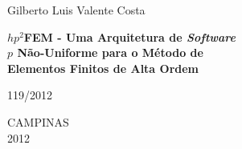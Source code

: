 \thispagestyle{fancy}
\fancyhf{}
\cfoot{\thepage}


\begin{center}
\vspace*{6.cm}

Gilberto Luis Valente Costa

\vspace{2.6cm}
{\fontsize{23}{23} \textbf{$hp^2$FEM - Uma Arquitetura de \textit{Software}}}	\\ \vspace{1.2ex}
{\fontsize{23}{23} \textbf{$p$ Não-Uniforme para o Método de}}			\\ \vspace{1.2ex}
{\fontsize{23}{23} \textbf{Elementos Finitos de Alta Ordem}}


\vspace*{4.6cm}
\begin{flushleft}
119/2012
\end{flushleft}

\vspace{3cm}
CAMPINAS\\ 2012
\end{center}


